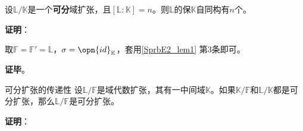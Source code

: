 











\begin{corollary}{}\label{SprbE2_cor2}
设$\mathbb{L}/\mathbb{K}$是一个\textbf{可分}域扩张，且$[\mathbb{L}:\mathbb{K}]=n$。则$\mathbb{L}$的保$\mathbb{K}$自同构有$n$个。
\end{corollary}

\textbf{证明}：

取$\mathbb{F}=\mathbb{F}'=\mathbb{L}$，$\sigma=\opn{id}_{\mathbb{K}}$，套用\autoref{SprbE2_lem1} 第$3$条即可。

\textbf{证毕}。



\begin{corollary}{可分扩张的传递性}\label{SprbE2_cor1}
设$\mathbb{L}/\mathbb{F}$是域代数扩张，其有一中间域$\mathbb{K}$。如果$\mathbb{K}/\mathbb{F}$和$\mathbb{L}/\mathbb{K}$都是可分扩张，那么$\mathbb{L}/\mathbb{F}$是可分扩张。
\end{corollary}

\textbf{证明}：





